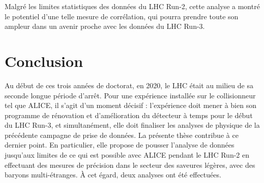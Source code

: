 Malgré les limites statistiques des données du LHC Run-2, cette analyse a montré le potentiel d'une telle mesure de corrélation, qui pourra prendre toute son ampleur dans un avenir proche avec les données du LHC Run-3.


\chapter{Conclusion}


Au début de ces trois années de doctorat, en 2020, le LHC était au milieu de sa seconde longue période d'arrêt. Pour une expérience installée sur le collisionneur tel que ALICE, il s'agit d'un moment décisif : l'expérience doit mener à bien son programme de rénovation et d'amélioration du détecteur à temps pour le début du LHC Run-3, et simultanément, elle doit finaliser les analyses de physique de la précédente campagne de prise de données. La présente thèse contribue à ce dernier point. En particulier, elle propose de pousser l'analyse de données jusqu'aux limites de ce qui est possible avec ALICE pendant le LHC Run-2 en effectuant des mesures de précision dans le secteur des saveures légères, avec des baryons multi-étranges. \`A cet égard, deux analyses ont été effectuées.\\


